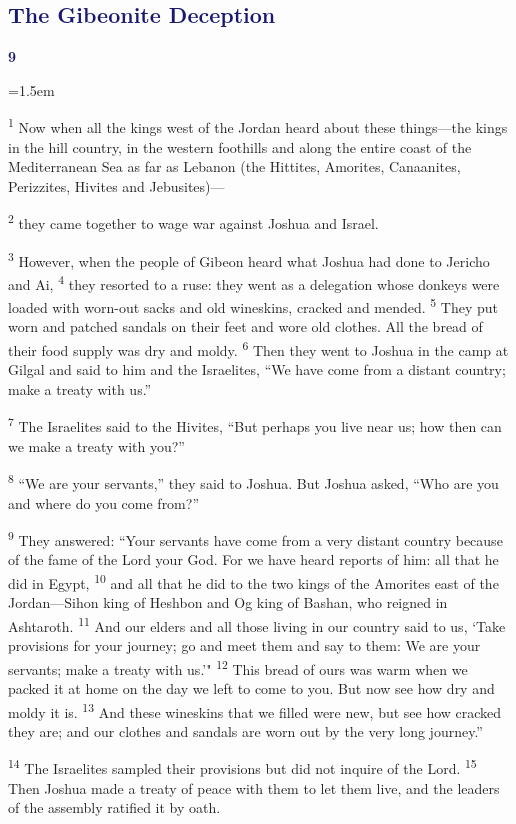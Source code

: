 \documentclass[12pt,twoside]{article}
\newcommand{\vs}[1]{\textsuperscript{#1}}
\newcommand{\chapterWithIndent}[2]{%
  \noindent
  \begin{minipage}[t]{1cm}
    \vspace{-0.4\baselineskip}
    {\textcolor{MidnightBlue}{\fontsize{40pt}{48pt}\selectfont \textbf{#1}}}
  \end{minipage}%
  \hspace{0.3cm}%
  \begin{minipage}[t]{\dimexpr\linewidth - 1.5cm - 0.3cm\relax}
    \hangindent=1.5em
    \hangafter=3
    #2
    \vspace{0.05cm}
  \end{minipage}
}
\begin{document}
\subsection*{\textcolor{MidnightBlue}{\textbf{The Gibeonite Deception}}}

\chapterWithIndent{9}{
  \vs{1} Now when all the kings west of the Jordan heard about these things---the kings in the hill country, in the western foothills and along the entire coast of the Mediterranean Sea as far as Lebanon (the Hittites, Amorites, Canaanites, Perizzites, Hivites and Jebusites)---
}

\noindent \vs{2} they came together to wage war against Joshua and Israel.

\vs{3} However, when the people of Gibeon heard what Joshua had done to Jericho and Ai,
\vs{4} they resorted to a ruse: they went as a delegation whose donkeys were loaded with worn-out sacks and old wineskins, cracked and mended.
\vs{5} They put worn and patched sandals on their feet and wore old clothes. All the bread of their food supply was dry and moldy.
\vs{6} Then they went to Joshua in the camp at Gilgal and said to him and the Israelites, ``We have come from a distant country; make a treaty with us.''

\vs{7} The Israelites said to the Hivites, ``But perhaps you live near us; how then can we make a treaty with you?''

\vs{8} ``We are your servants,'' they said to Joshua. But Joshua asked, ``Who are you and where do you come from?''

\vs{9} They answered: ``Your servants have come from a very distant country because of the fame of the Lord your God. For we have heard reports of him: all that he did in Egypt,
\vs{10} and all that he did to the two kings of the Amorites east of the Jordan---Sihon king of Heshbon and Og king of Bashan, who reigned in Ashtaroth.
\vs{11} And our elders and all those living in our country said to us, `Take provisions for your journey; go and meet them and say to them: We are your servants; make a treaty with us.'"
\vs{12} This bread of ours was warm when we packed it at home on the day we left to come to you. But now see how dry and moldy it is.
\vs{13} And these wineskins that we filled were new, but see how cracked they are; and our clothes and sandals are worn out by the very long journey.''

\vs{14} The Israelites sampled their provisions but did not inquire of the Lord.
\vs{15} Then Joshua made a treaty of peace with them to let them live, and the leaders of the assembly ratified it by oath.
\end{document}
